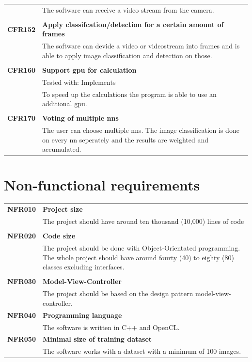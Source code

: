 \documentclass[parskip=full]{scrartcl}
\begin{document}
\begin{tabular}{p{2cm}p{12cm}}
& The software can receive a video stream from the camera.\\
& \\
\textbf{CFR152} & \textbf{Apply classifcation/detection for a certain amount of frames}\\
& The software can devide a video or videostream into frames and is able to apply \gls{image classification} and detection on those.\\
& \\
\textbf {CFR160} & \textbf{Support \gls{gpu} for calculation} \\
& Tested with: Implements\\
& To speed up the calculations the program is able to use an additional \gls{gpu}.\\
& \\
\textbf{CFR170} & \textbf{Voting of multiple \glspl{nn}}\\
& The user can choose multiple \glspl{nn}. The \gls{image classification} is done on every \gls{nn} seperately and the results are weighted and accumulated.\\

\end{tabular}

\section{Non-functional requirements}
\begin{tabular}{p{2cm}p{12cm}}
\textbf{NFR010} & \textbf{Project size}\\
& The project should have around ten thousand (10,000) lines of code \\
& \\
\textbf{NFR020} & \textbf{Code size}\\
& The project should be done with Object-Orientated programming. The whole project should have around fourty (40) to eighty (80) classes excluding interfaces. \\
& \\
\textbf{NFR030} & \textbf{Model-View-Controller}\\
& The project should be based on the design pattern model-view-controller. \\
\textbf{NFR040} & \textbf{Programming language}\\
& The software is written in C++ and OpenCL.\\
\textbf{NFR050} & \textbf{Minimal size of training dataset}\\
& The software works with a dataset with a minimum of 100 images.
\end{tabular}
\end{document}
